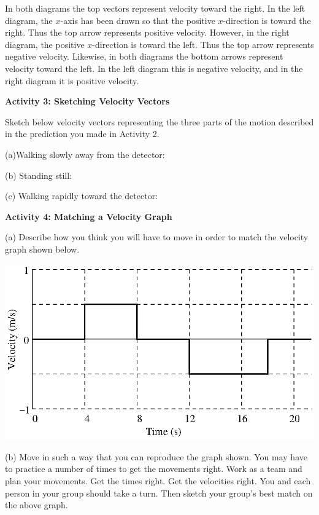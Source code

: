 In both diagrams the top vectors represent velocity toward the right. In the
left diagram, the $x$-axis has been drawn so that the positive $x$-direction is
toward the right. Thus the top arrow represents positive velocity. However,
in the right diagram, the positive $x$-direction is toward the left. Thus the
top arrow represents negative velocity. Likewise, in both diagrams the bottom
arrows represent velocity toward the left. In the left diagram this is negative
velocity, and in the right diagram it is positive velocity.

\textbf{Activity 3: Sketching Velocity Vectors} 

Sketch below velocity vectors representing the three parts of the motion described
in the prediction you made in Activity 2.

(a)Walking slowly away from the detector:

(b) Standing still:

(c) Walking rapidly toward the detector:

\textbf{Activity 4: Matching a Velocity Graph} 

(a) Describe how you think you will have to move in order to match the velocity
graph shown below.

\vspace{0.3cm}
{\par\centering \includegraphics{velocity/velocity_fig7.eps} \par}
\vspace{0.3cm}

\vspace{20mm}
(b) Move in such a way that you can reproduce the graph shown. You may have
to practice a number of times to get the movements right. Work as a team and
plan your movements. Get the times right. Get the velocities right. You and
each person in your group should take a turn. Then sketch your group's best
match on the above graph.

